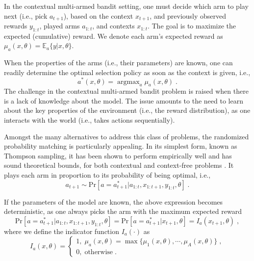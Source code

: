 \documentclass{article}
\newcommand{\ie}{i.e., }
\newcommand{\argmax}{\mathop{\mathrm{argmax}}}
\begin{document}
In the contextual multi-armed bandit setting, one must decide which arm to play next (\ie pick $a_{t+1}$), based on the context $x_{t+1}$, and previously observed rewards $y_{1:t}$, played arms $a_{1:t}$, and contexts $x_{1:t}$. The goal is to maximize the expected (cumulative) reward. We denote each arm's expected reward as $\mu_{a}(x,\theta)=\mathbb{E}_{a}\{y|x,\theta\}$. 

When the properties of the arms (\ie their parameters) are known, one can readily determine the optimal selection policy as soon as the context is given, \ie
\begin{equation}
a^*(x,\theta)=\argmax_{a}\mu_{a}(x,\theta) \; .
\end{equation}
The challenge in the contextual multi-armed bandit problem is raised when there is a lack of knowledge about the model. The issue amounts to the need to learn about the key properties of the environment (\ie the reward distribution), as one interacts with the world (\ie takes actions sequentially).

Amongst the many alternatives to address this class of problems, the randomized probability matching is particularly appealing. In its simplest form, known as Thompson sampling, it has been shown to perform empirically well \cite{ic-Chapelle2011, j-Scott2015} and has sound theoretical bounds, for both contextual and context-free problems \cite{ip-Agrawal2013a,ip-Agrawal2013,ip-Agrawal2012}. It plays each arm in proportion to its probability of being optimal, \ie
\begin{equation}
a_{t+1} \sim \mathrm{Pr}\left[a=a_{t+1}^*|a_{1:t}, x_{1:t+1}, y_{1:t}, \theta \right] \;.
\end{equation} 

If the parameters of the model are known, the above expression becomes deterministic, as one always picks the arm with the maximum expected reward
\begin{equation}
\mathrm{Pr}\left[a=a_{t+1}^*|a_{1:t}, x_{1:t+1}, y_{1:t},\theta \right] = \mathrm{Pr}\left[a=a_{t+1}^*|x_{t+1}, \theta \right] = I_a(x_{t+1},\theta) \;,
\label{eq:theta_known_pr_arm_optimal}
\end{equation}
where we define the indicator function $I_a(\cdot)$ as
\begin{equation}
I_a(x,\theta) = \begin{cases}
1, \; \mu_{a}(x,\theta)=\max\{\mu_1(x,\theta), \cdots, \mu_A(x,\theta)\} \;, \\
0, \; \text{otherwise} \;.
\end{cases}
\end{equation}
\end{document}
